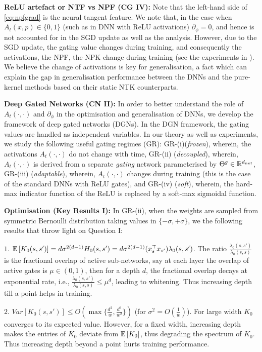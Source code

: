 \documentclass{article}
\begin{document}
\textbf{ReLU artefact or NTF vs NPF (CG IV):} Note that the left-hand side of \eqref{eq:npfgrad} is the neural tangent feature. We note that, in the case when $A_t(x,p)\in\{0,1\}$ (such as in DNN with ReLU activations)  $\partial_{\phi}=0$, and hence is not accounted for in the SGD update as well as the analysis. However, due to the SGD update, the gating value changes during training, and consequently the activations, the NPF, the NPK change during training (see the experiments in ). We believe the change of activations is key for generalisation, a fact which can explain the gap in generalisation performance \cite{} between the DNNs and the pure-kernel methods based on their static NTK counterparts.

\textbf{Deep Gated Networks (CN II):} In order to better understand the role of $A_t(\cdot,\cdot)$ and $\partial_{\phi}$ in the optimisation and generalisation of DNNs, we develop the framework of deep gated networks (DGNs). In the DGN framework, the gating values are handled as independent variables. In our theory as well as experiments, we study the following useful gating regimes (GR): GR-(i)(\emph{frozen}), wherein, the activations $A_t(\cdot,\cdot)$ do not change with time, GR-(ii) (\emph{decoupled}), wherein, $A_t(\cdot,\cdot)$ is derived from a separate \emph{gating} network parameterised by ${\Theta}^g\in \mathbb{R}^{d_{net}}$,  GR-(iii) (\emph{adaptable}), wherein, $A_t(\cdot,\cdot)$ changes during training (this is the case of the standard DNNs with ReLU gates), and GR-(iv) (\emph{soft}), wherein, the hard-max indicator function of the ReLU is replaced by a soft-max sigmoidal function.

\textbf{Optimisation (Key Results I):} In GR-(ii), when the weights are sampled from symmetric Bernoulli distribution taking values in $\{-\sigma,+\sigma\}$, we the following results that throw light on Question I: 

$1.$ $\mathbb{E}\left[K_0(s,s')\right]=d\sigma^{2(d-1)}H_0(s,s')=d\sigma^{2(d-1)}(x_s^\top x_{s'})\lambda_0(s,s')$. The ratio $\frac{{\lambda_0}(s,s')}{{\lambda_0}(s,s)}$ is the fractional overlap of active sub-networks, say at each layer the overlap of active gates is $\mu\in (0,1)$, then for a depth $d$, the fractional overlap decays at exponential rate, i.e., $\frac{{\lambda_0}(s,s')}{{\lambda_0}(s,s)}\leq \mu^d$, leading to whitening. Thus increasing depth till a point helps in training.

$2.$ $Var\left[K_0(s,s')\right]\leq O(\max\{\frac{d^2}{w}, \frac{d^3}{w^2}\})$ (for $\sigma^2=O(\frac{1}w)$). For large width $K_0$ converges to its expected value. However, for a fixed width, increasing depth makes the entries of $K_0$ deviate from $\mathbb{E}\left[K_0\right]$, thus degrading the spectrum of $K_0$. Thus increasing depth beyond a point hurts training performance.
\end{document}
